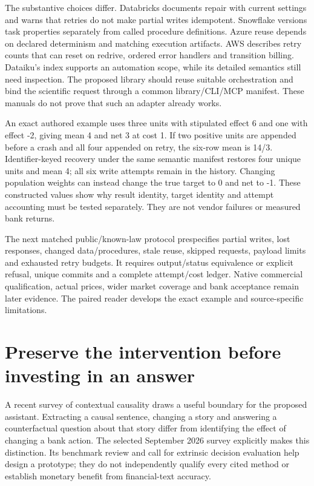 The substantive choices differ. Databricks documents repair with current
settings and warns that retries do not make partial writes idempotent.
Snowflake versions task properties separately from called procedure
definitions. Azure reuse depends on declared determinism and matching
execution artifacts. AWS describes retry counts that can reset on
redrive, ordered error handlers and transition billing. Dataiku's index
supports an automation scope, while its detailed semantics still need
inspection. The proposed library should reuse suitable orchestration and
bind the scientific request through a common library/CLI/MCP manifest.
These manuals do not prove that such an adapter already works.
\citep{exec22_workflow_databricks_repair,exec22_workflow_snowflake_graphs,exec22_workflow_azure_reuse,exec22_workflow_aws_errors,exec22_workflow_dataiku_scenarios}

An exact authored example uses three units with stipulated effect 6 and
one with effect -2, giving mean 4 and net 3 at cost 1. If two positive
units are appended before a crash and all four appended on retry, the
six-row mean is 14/3. Identifier-keyed recovery under the same semantic
manifest restores four unique units and mean 4; all six write attempts
remain in the history. Changing population weights can instead change
the true target to 0 and net to -1. These constructed values show why
result identity, target identity and attempt accounting must be tested
separately. They are not vendor failures or measured bank
returns.\citep{exec22_workflow_reference}

The next matched public/known-law protocol prespecifies partial writes,
lost responses, changed data/procedures, stale reuse, skipped requests,
payload limits and exhausted retry budgets. It requires output/status
equivalence or explicit refusal, unique commits and a complete
attempt/cost ledger. Native commercial qualification, actual prices,
wider market coverage and bank acceptance remain later evidence. The
paired reader develops the exact example and source-specific
limitations.\citep{sp23nt_reader,sp23nt_progress}

\hypertarget{preserve-the-intervention-before-investing-in-an-answer}{%
\section{Preserve the intervention before investing in an
answer}\label{preserve-the-intervention-before-investing-in-an-answer}}

A recent survey of contextual causality draws a useful boundary for the
proposed assistant. Extracting a causal sentence, changing a story and
answering a counterfactual question about that story differ from
identifying the effect of changing a bank action. The selected September
2026 survey explicitly makes this distinction. Its benchmark review and
call for extrinsic decision evaluation help design a prototype; they do
not independently qualify every cited method or establish monetary
benefit from financial-text accuracy.
\citep{exec23_contextual_causality_survey}

